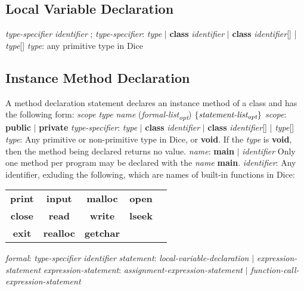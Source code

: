 \begin{homeworkProblem}
    \subsection{Local Variable Declaration}
    \textit{type-specifier} \textit{identifier} ;
    \newline
    \textit{type-specifier}: \textit{type} $|$ \textbf{class} \textit{identifier} $|$ \textbf{class} \textit{identifier}[] | \textit{type}[]
    \newline
    \textit{type}: any primitive type in Dice

    \subsection{Instance Method Declaration}
    A method declaration statement declares an instance method of a class and has the following form:
    \newline
    \textit{scope} \textit{type} \textit{name} (\textit{formal-list\textsubscript{opt}}) $\left\{ \textit{statement-list\textsubscript{opt}} \right\}$
    \newline
    \textit{scope}: \textbf{public} $|$ \textbf{private}
    \newline
    \textit{type-specifier}: \textit{type} $|$ \textbf{class} \textit{identifier} $|$ \textbf{class} \textit{identifier}[] | \textit{type}[]
    \newline
    \textit{type}: Any primitive or non-primitive type in Dice, or \textbf{void}. If the \textit{type} is \textbf{void}, then the method being declared returns no value.
    \newline
    \textit{name}: \textbf{main} $|$ \textit{identifier}
    \newline
    Only one method per program may be declared with the \textit{name} \textbf{main}.
    \newline
    \textit{identifier}: Any identifier, exluding the following, which are names of built-in functions in Dice:
    \newline
    \begin{center}
    \begin{tabular}{ccccc}
    \textbf{print} & \textbf{input} & \textbf{malloc} & \textbf{open} \\
    \textbf{close} & \textbf{read} & \textbf{write} & \textbf{lseek} \\
    \textbf{exit} & \textbf{realloc} & \textbf{getchar}
    \end{tabular}
    \end{center}
    \textit{formal}: \textit{type-specifier} \textit{identifier}
    \newline
    \textit{statement}: \textit{local-variable-declaration} $|$ \textit{expression-statement}
    \newline
    \textit{expression-statement}: \textit{assignment-expression-statement} $|$ \textit{function-call-expression-statement}


\end{homeworkProblem}
